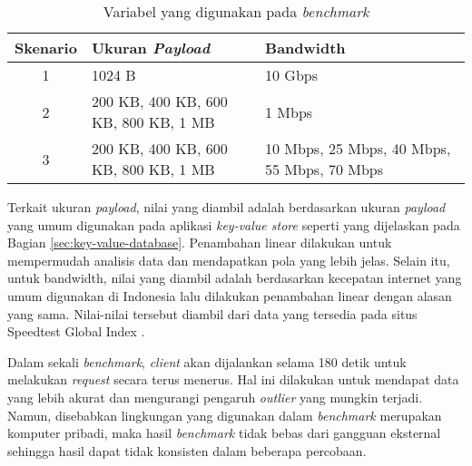 \begin{table}[ht]
  \centering
  \caption{Variabel yang digunakan pada \textit{benchmark}}
  \label{tab:variabel-benchmark}
  \begin{tabular}{|c|p{5.5cm}|p{5.5cm}|}
    \hline
    \textbf{Skenario} & \textbf{Ukuran \textit{Payload}} & \textbf{Bandwidth} \\ \hline
    1 & 1024 B & 10 Gbps \\ \hline
    2 & 200 KB, 400 KB, 600 KB, 800 KB, 1 MB & 1 Mbps \\ \hline
    3 & 200 KB, 400 KB, 600 KB, 800 KB, 1 MB & 10 Mbps, 25 Mbps, 40 Mbps, 55 Mbps, 70 Mbps \\ \hline
  \end{tabular}
\end{table}

Terkait ukuran \textit{payload}, nilai yang diambil adalah berdasarkan ukuran \textit{payload} yang umum digunakan pada aplikasi \textit{key-value store} seperti yang dijelaskan pada Bagian \ref{sec:key-value-database}. Penambahan linear dilakukan untuk mempermudah analisis data dan mendapatkan pola yang lebih jelas. Selain itu, untuk bandwidth, nilai yang diambil adalah berdasarkan kecepatan internet yang umum digunakan di Indonesia lalu dilakukan penambahan linear dengan alasan yang sama. Nilai-nilai tersebut diambil dari data yang tersedia pada situs Speedtest Global Index \cite{ookla2025speedtest}.

Dalam sekali \textit{benchmark}, \textit{client} akan dijalankan selama 180 detik untuk melakukan \textit{request} secara terus menerus. Hal ini dilakukan untuk mendapat data yang lebih akurat dan mengurangi pengaruh \textit{outlier} yang mungkin terjadi. Namun, disebabkan lingkungan yang digunakan dalam \textit{benchmark} merupakan komputer pribadi, maka hasil \textit{benchmark} tidak bebas dari gangguan eksternal sehingga hasil dapat tidak konsisten dalam beberapa percobaan.